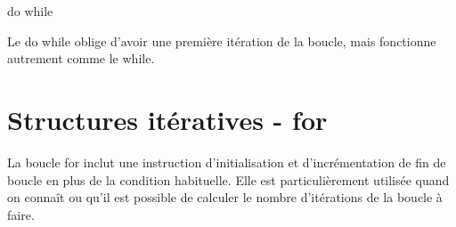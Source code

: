 \begin{frame}[fragile]{do while}
\protect\hypertarget{do-while}{}

Le do while oblige d'avoir une première itération de la boucle, mais
fonctionne autrement comme le while.

\begin{Shaded}
\begin{Highlighting}[]
\NormalTok{ \{}
\NormalTok{\} }
\end{Highlighting}
\end{Shaded}

\end{frame}

\hypertarget{structures-ituxe9ratives---for}{%
\section{Structures itératives -
for}\label{structures-ituxe9ratives---for}}

\begin{frame}[fragile]{}
\protect\hypertarget{section-3}{}

La boucle for inclut une instruction d'initialisation et
d'incrémentation de fin de boucle en plus de la condition habituelle.
Elle est particulièrement utilisée quand on connaît ou qu'il est
possible de calculer le nombre d'itérations de la boucle à faire.

\begin{Shaded}
\end{Shaded}

\end{frame}
